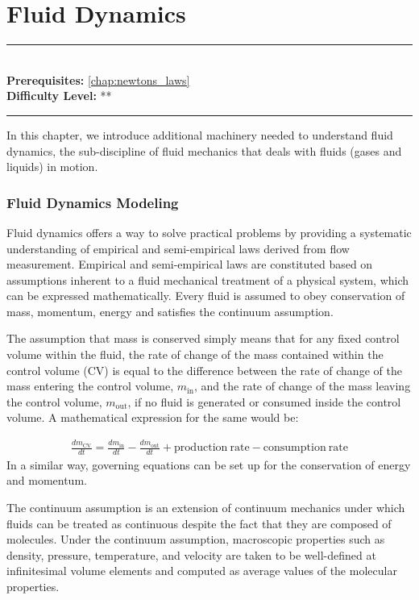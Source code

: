 \documentclass[book.tex]{subfiles}
\begin{document}
\chapter{Fluid Dynamics}

\label{chap:fluid}
\noindent\rule{11cm}{0.4pt} \\
\textbf{Prerequisites:}  \autoref{chap:newtons_laws}  \\
\textbf{Difficulty Level:} ** \\
\noindent\rule{11cm}{0.4pt}
\vspace{5mm}

In this chapter, we introduce additional machinery needed to understand fluid dynamics, the sub-discipline of fluid mechanics that deals with fluids (gases and liquids) in motion. 

\subsection{Fluid Dynamics Modeling}
Fluid dynamics offers a way to solve practical problems by providing a systematic understanding of empirical and semi-empirical laws derived from flow measurement. Empirical and semi-empirical laws are constituted based on assumptions inherent to a fluid mechanical treatment of a physical system, which can be expressed mathematically. Every fluid is assumed to obey conservation of mass, momentum, energy and satisfies the continuum assumption.

The assumption that mass is conserved simply means that for any fixed control volume within the fluid, the rate of change of the mass contained within the control volume (CV) is equal to the difference between the rate of change of the mass entering the control volume, $m_{\mathrm{in}}$, and the rate of change of the mass leaving the control volume, $m_{\mathrm{out}}$, if no fluid is generated or consumed inside the control volume. A mathematical expression for the same would be:

\begin{align}
    \frac{dm_{\mathrm{CV}}}{dt}=\frac{dm_{\mathrm{in}}}{dt}-\frac{dm_{\mathrm{out}}}{dt}+\mathrm{production\ rate}- \mathrm{consumption\ rate}
\end{align}
In a similar way, governing equations can be set up for the conservation of energy and momentum.

The continuum assumption is an extension of continuum mechanics under which fluids can be treated as continuous despite the fact that they are composed of molecules. Under the continuum assumption, macroscopic properties such as density, pressure, temperature, and velocity are taken to be well-defined at infinitesimal volume elements and computed as average values of the molecular properties. 
\end{document}
